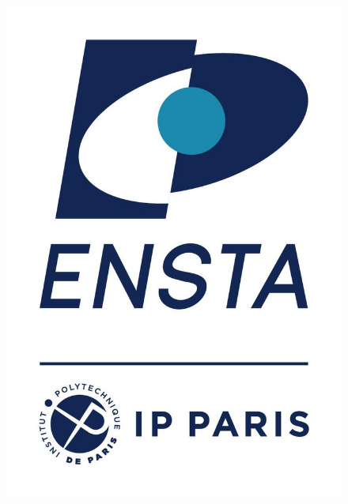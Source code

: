 \documentclass{amsart}
\begin{document}
\thispagestyle{empty}

\begin{figure}[htbp]
    \centering
    \begin{minipage}[b]{0.22\textwidth}
        \centering
        \includegraphics[width=\textwidth]{logo/logo.jpg}
    \end{minipage}
    \hfill
    \begin{minipage}[b]{0.25\textwidth}
        \centering

\end{minipage}
\end{figure}
\end{document}
